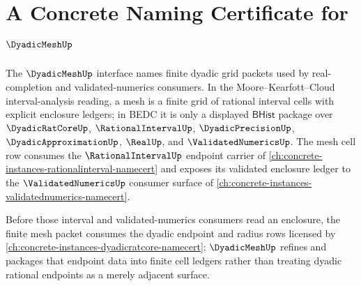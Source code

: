 \chapter{A Concrete Naming Certificate for $\DyadicMeshUp$}
\label{ch:concrete-instances-dyadicmesh-namecert}

The $\DyadicMeshUp$ interface names finite dyadic grid packets used by real-completion and validated-numerics consumers. In the Moore--Kearfott--Cloud interval-analysis reading, a mesh is a finite grid of rational interval cells with explicit enclosure ledgers; in BEDC it is only a displayed $\mathsf{BHist}$ package over $\DyadicRatCoreUp$, $\RationalIntervalUp$, $\DyadicPrecisionUp$, $\DyadicApproximationUp$, $\RealUp$, and $\ValidatedNumericsUp$. The mesh cell row consumes the $\RationalIntervalUp$ endpoint carrier of \autoref{ch:concrete-instances-rationalinterval-namecert} and exposes its validated enclosure ledger to the $\ValidatedNumericsUp$ consumer surface of \autoref{ch:concrete-instances-validatednumerics-namecert}.

Before those interval and validated-numerics consumers read an enclosure, the finite mesh packet consumes the dyadic endpoint and radius rows licensed by \autoref{ch:concrete-instances-dyadicratcore-namecert}; $\DyadicMeshUp$ refines and packages that endpoint data into finite cell ledgers rather than treating dyadic rational endpoints as a merely adjacent surface.

